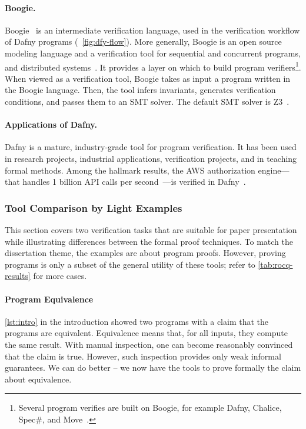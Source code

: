\paragraph*{Boogie.}
{Boogie}~\cite{leino2008} is an intermediate verification language, used in the verification workflow of Dafny programs (\cf~\autoref{fig:dfy-flow}).
More generally, Boogie is an open source modeling language and a verification tool for sequential and concurrent programs, and distributed systems~\cite{boogie}.
It provides a layer on which to build program verifiers\footnote{
Several program verifies are built on Boogie, for example Dafny, Chalice, Spec\#, and Move~\cite{boogie}.}.
When viewed as a verification tool, Boogie takes as input a program written in the Boogie language.
Then, the tool infers invariants, generates verification conditions, and passes them to an SMT solver.
The default SMT solver is Z3~\cite{demoura2008}.

\paragraph*{Applications of Dafny.}
Dafny is a mature, industry-grade tool for program verification.
It has been used in research projects, industrial applications, verification projects, and in teaching formal methods.
Among the hallmark results, the AWS authorization engine---that handles 1 billion API calls per second~\cite{wagner2024}---is verified in Dafny~\cite{chakarov2025}.

\subsubsection{Tool Comparison by Light Examples}
\label{sm-tool-examples}

This section covers two verification tasks that are suitable for paper presentation while illustrating differences between the formal proof techniques.
To match the dissertation theme, the examples are about program proofs.
However, proving programs is only a subset of the general utility of these tools;
refer to \autoref{tab:rocq-results} for more cases.

\paragraph{Program Equivalence}

\autoref{lst:intro} in the introduction showed two programs with a claim that the programs are equivalent.
Equivalence means that, for all inputs, they compute the same result.
With manual inspection, one can become reasonably convinced that the claim is true.
However, such inspection provides only weak informal guarantees.
We can do better -- we now have the tools to prove formally the claim about equivalence.

